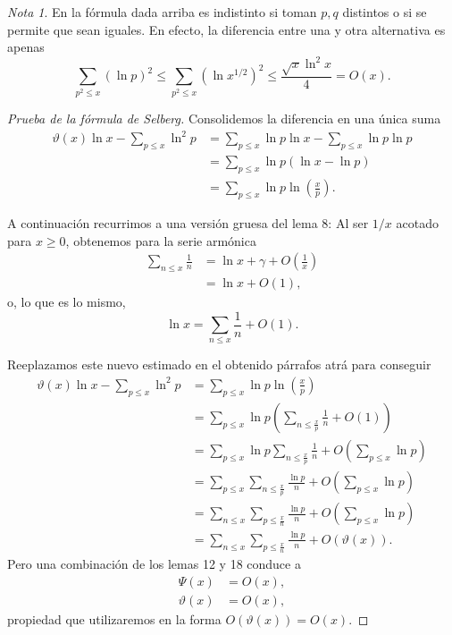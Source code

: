 \documentclass[10pt]{article}
\theoremstyle{definition}
\theoremstyle{remark}
\newtheorem*{note}{Nota}
\begin{document}
\begin{note}
En la f\'ormula dada arriba es indistinto si toman $p,q$ distintos o si se permite que sean iguales. 
En efecto, la diferencia entre una y otra alternativa es apenas  
$$
\sum_{p^2 \le x} (\ln p)^2 \le \sum_{p^2 \le x} (\ln x^{1/2})^2 \le \frac{\sqrt{x} \ln^2 x}{4}= O(x).  
$$
\end{note}

\begin{proof}[Prueba de la f\'ormula de Selberg]
Consolidemos la diferencia en una \'unica suma 
\begin{align*}
\vartheta(x)\ln x - \sum_{p \leq x} \ln^2 p &= \sum_{p \leq x} \ln p \ln x - \sum_{p \leq x} \ln p \ln p \\
&= \sum_{p \leq x} \ln p (\ln x - \ln p) \\
&= \sum_{p \leq x} \ln p \ln \left(\frac{x}{p}\right). 
\end{align*}

A continuaci\'on recurrimos a una versi\'on gruesa del lema 8:  
Al ser $1/x$ acotado para $x \ge 0$, obtenemos  para la serie arm\'onica 
\begin{align*}
\sum_{n \leq x} \frac{1}{n} &= \ln x + \gamma + O\left(\frac{1}{x}\right) \\
&= \ln x + O(1),  
\end{align*}
o, lo que es lo mismo, 
$$
\ln x = \sum_{n \leq x} \frac{1}{n} + O(1). 
$$

Reeplazamos este nuevo estimado en el obtenido p\'arrafos atr\'a para conseguir 
\begin{align*}
\vartheta(x)\ln x - \sum_{p \leq x} \ln^2 p &= \sum_{p \leq x} \ln p \ln \left(\frac{x}{p}\right) \\
&= \sum_{p \leq x} \ln p \left(\sum_{n \leq \frac{x}{p}} \frac{1}{n} + O(1)\right) \\
&= \sum_{p \leq x} \ln p \sum_{n \leq \frac{x}{p}} \frac{1}{n} + O\left(\sum_{p \leq x} \ln p\right) \\
&= \sum_{p \leq x} \sum_{n \leq \frac{x}{p}} \frac{\ln p}{n} + O\left(\sum_{p \leq x} \ln p\right) \\
&= \sum_{n \leq x} \sum_{p \leq \frac{x}{n}} \frac{\ln p}{n} + O\left(\sum_{p \leq x} \ln p\right) \\
&= \sum_{n \leq x} \sum_{p \leq \frac{x}{n}} \frac{\ln p}{n} + O(\vartheta(x)).
\end{align*}
Pero una combinaci\'on de los lemas 12 y 18 conduce a 
\begin{align*}
\Psi(x) &= O(x),  \\
\vartheta(x) &= O(x),
\end{align*}
propiedad que utilizaremos en la forma $O(\vartheta(x))=O(x)$.


\end{proof}
\end{document}
